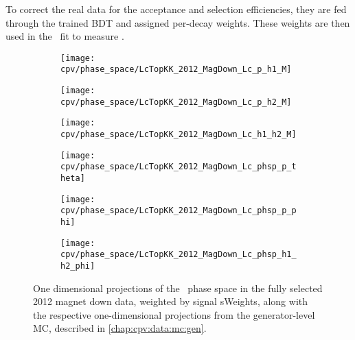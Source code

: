 To correct the real data for the acceptance and selection efficiencies, they 
are fed through the trained \ac{BDT} and assigned per-decay weights.
These weights are then used in the \chisq\ fit to measure \ARaw.

\begin{figure}
  \centering
  \begin{subfigure}{0.4\textwidth}
    \texttt{[image: cpv/phase\_space/LcTopKK\_2012\_MagDown\_Lc\_p\_h1\_M]}
    \label{fig:cpv:phsp:data:pKK:msqphm}
  \end{subfigure}
  \begin{subfigure}{0.4\textwidth}
    \texttt{[image: cpv/phase\_space/LcTopKK\_2012\_MagDown\_Lc\_p\_h2\_M]}
    \label{fig:cpv:phsp:data:pKK:msqphp}
  \end{subfigure}
  \begin{subfigure}{0.4\textwidth}
    \texttt{[image: cpv/phase\_space/LcTopKK\_2012\_MagDown\_Lc\_h1\_h2\_M]}
    \label{fig:cpv:phsp:data:pKK:msqhh}
  \end{subfigure}
  \begin{subfigure}{0.4\textwidth}
    \texttt{[image: cpv/phase\_space/LcTopKK\_2012\_MagDown\_Lc\_phsp\_p\_theta]}
    \label{fig:cpv:phsp:data:pKK:proton_theta}
  \end{subfigure}
  \begin{subfigure}{0.4\textwidth}
    \texttt{[image: cpv/phase\_space/LcTopKK\_2012\_MagDown\_Lc\_phsp\_p\_phi]}
    \label{fig:cpv:phsp:data:pKK:proton_phi}
  \end{subfigure}
  \begin{subfigure}{0.4\textwidth}
    \texttt{[image: cpv/phase\_space/LcTopKK\_2012\_MagDown\_Lc\_phsp\_h1\_h2\_phi]}
    \label{fig:cpv:phsp:data:pKK:h1_h2_phi}
  \end{subfigure}
  \caption{%
    One dimensional projections of the \LcTopKK\ phase space in the fully 
    selected 2012 magnet down data, weighted by signal sWeights, along with the 
    respective one-dimensional projections from the generator-level \ac{MC}, 
    described in \cref{chap:cpv:data:mc:gen}.
  }
  \label{fig:cpv:phsp:data_1D:pKK}
\end{figure}

